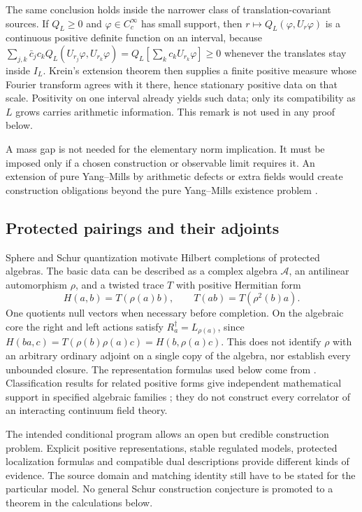 \begin{remark}\label{rem:krein}
The same conclusion holds inside the narrower class of translation-covariant
sources. If $Q_L\geq0$ and $\varphi\in C_c^\infty$ has small support, then
$r\mapsto Q_L(\varphi,U_r\varphi)$ is a continuous positive definite
function on an interval, because
$\sum_{j,k}\bar c_jc_kQ_L(U_{r_j}\varphi,U_{r_k}\varphi)
=Q_L[\sum_kc_kU_{r_k}\varphi]\geq0$ whenever the translates stay inside
$I_L$. Krein's extension theorem \cite{Krein,Sasvari} then supplies a finite
positive measure whose Fourier transform agrees with it there, hence
stationary positive data on that scale. Positivity on one interval already
yields such data; only its compatibility as $L$ grows carries arithmetic
information. This remark is not used in any proof below.
\end{remark}

A mass gap is not needed for the elementary norm implication.
It must be imposed only if a chosen construction or observable limit
requires it. An extension of pure Yang--Mills by arithmetic defects or
extra fields would create construction obligations beyond the pure
Yang--Mills existence problem \cite{ClayYM}.

\subsection{Protected pairings and their adjoints}
Sphere and Schur quantization motivate Hilbert completions of protected
algebras. The basic data can be described as a complex algebra
$\mathcal A$, an antilinear automorphism $\rho$, and a twisted trace $T$
with positive Hermitian form
\begin{equation}\label{eq:twisted}
 H(a,b)=T(\rho(a)b),\qquad
 T(ab)=T(\rho^2(b)a).
\end{equation}
One quotients null vectors when necessary before completion. On the
algebraic core the right and left actions satisfy
$R_a^\dagger=L_{\rho(a)}$, since
$H(ba,c)=T(\rho(b)\rho(a)c)=H(b,\rho(a)c)$.
This does not identify $\rho$ with an arbitrary ordinary adjoint on a
single copy of the algebra, nor establish every unbounded closure.
The representation formulas used below come from
\cite{Sphere,Schur,RG}. Classification results for related positive
forms give independent mathematical support in specified algebraic
families \cite{EKRS,Klyuev}; they do not construct every correlator of
an interacting continuum field theory.

The intended conditional program allows an open but credible construction
problem. Explicit positive representations, stable regulated models,
protected localization formulas and compatible dual descriptions provide
different kinds of evidence. The source domain and matching identity
still have to be stated for the particular model. No general Schur
construction conjecture is promoted to a theorem in the calculations below.

